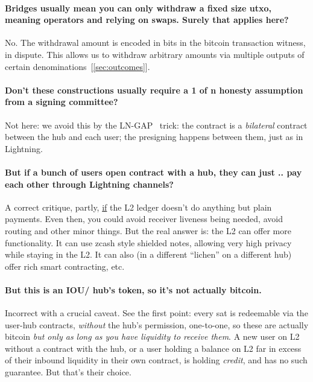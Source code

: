 \documentclass[11pt]{article}
\begin{document}
\paragraph{Bridges usually mean you can only withdraw a fixed size utxo, meaning operators and relying on swaps. Surely that applies here?} No. The withdrawal amount is encoded in bits in the bitcoin transaction witness, in dispute. This allows us to withdraw arbitrary amounts via multiple outputs of certain denominations~[\ref{sec:outcomes}].

\paragraph{Don't these constructions usually require a 1 of n honesty assumption from a signing committee?} Not here: we avoid this by the LN-GAP~\cite{lngap} trick: the contract is a \emph{bilateral} contract between the hub and each user; the presigning happens between them, just as in Lightning.

\paragraph{But if a bunch of users open contract with a hub, they can just .. pay each other through Lightning channels?} A correct critique, partly, \underline{if} the L2 ledger doesn't do anything but plain payments. Even then, you could avoid receiver liveness being needed, avoid routing and other minor things. But the real answer is: the L2 can offer more functionality. It can use zcash style shielded notes, allowing very high privacy while staying in the L2. It can also (in a different ``lichen'' on a different hub) offer rich smart contracting, etc.

\paragraph{But this is an IOU/ hub's token, so it's not actually bitcoin.} Incorrect with a crucial caveat. See the first point: every sat is redeemable via the user-hub contracts, \emph{without} the hub's permission, one-to-one, so these are actually bitcoin \emph{but only as long as you have liquidity to receive them}. A new user on L2 without a contract with the hub, or a user holding a balance on L2 far in excess of their inbound liquidity in their own contract, is holding \emph{credit}, and has no such guarantee. But that's their choice.
\end{document}
